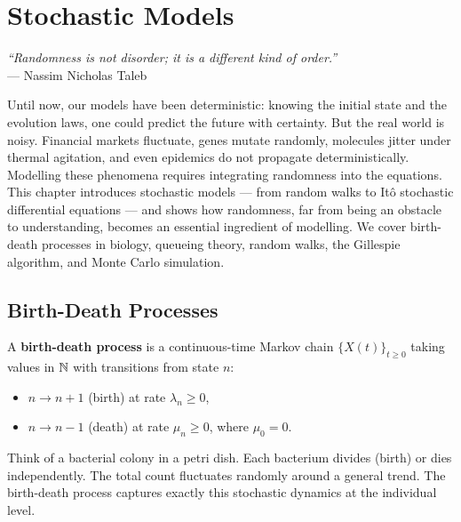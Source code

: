 \chapter{Stochastic Models}
\label{ch:stochastic}

\begin{center}
\textit{``Randomness is not disorder; it is a different kind of order.''}\\[4pt]
--- Nassim Nicholas Taleb
\end{center}

\bigskip

Until now, our models have been deterministic: knowing the initial state and the evolution laws, one could predict the future with certainty. But the real world is noisy. Financial markets fluctuate, genes mutate randomly, molecules jitter under thermal agitation, and even epidemics do not propagate deterministically. Modelling these phenomena requires integrating randomness into the equations. This chapter introduces stochastic models --- from random walks to It\^o stochastic differential equations --- and shows how randomness, far from being an obstacle to understanding, becomes an essential ingredient of modelling. We cover birth-death processes in biology, queueing theory, random walks, the Gillespie algorithm, and Monte Carlo simulation.

\section{Birth-Death Processes}
\label{sec:birth_death}

\begin{definition}
A \textbf{birth-death process} is a continuous-time Markov chain
$\{X(t)\}_{t \geq 0}$ taking values in $\mathbb{N}$ with transitions
from state $n$:
\begin{itemize}
  \item $n \to n+1$ (birth) at rate $\lambda_n \geq 0$,
  \item $n \to n-1$ (death) at rate $\mu_n \geq 0$, where $\mu_0 = 0$.
\end{itemize}
\end{definition}

\begin{intuition}
Think of a bacterial colony in a petri dish. Each bacterium divides
(birth) or dies independently. The total count fluctuates randomly
around a general trend. The birth-death process captures exactly
this stochastic dynamics at the individual level.
\end{intuition}

